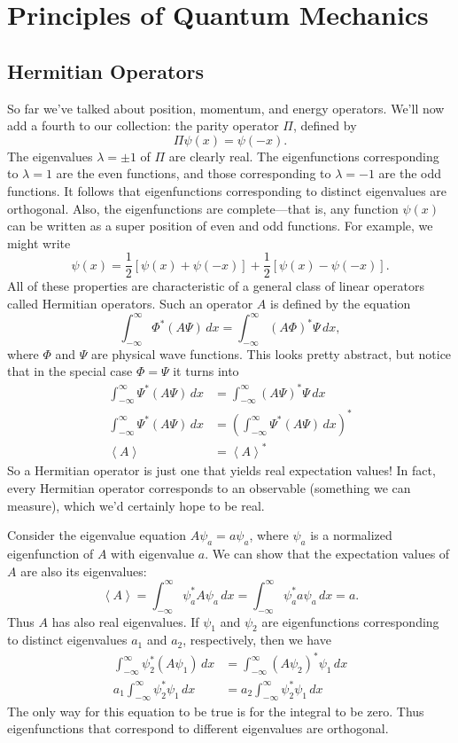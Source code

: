 \documentclass[../p052main.tex]{subfiles}
\begin{document}
\chapter{Principles of Quantum Mechanics}
\section{Hermitian Operators}
So far we've talked about position, momentum, and energy operators.
We'll now add a fourth to our collection: the parity operator $\Pi$, defined by
\[ \Pi \psi(x) = \psi(-x). \]
The eigenvalues $\lambda = \pm 1$ of $\Pi$ are clearly real.
The eigenfunctions corresponding to $\lambda = 1$ are the even functions, and those corresponding to $\lambda = -1$ are the odd functions.
It follows that eigenfunctions corresponding to distinct eigenvalues are orthogonal.
Also, the eigenfunctions are complete---that is, any function $\psi(x)$ can be written as a super position of even and odd functions.
For example, we might write
\[ \psi (x) = \frac{1}{2} \left[ \psi(x) + \psi(-x) \right] + \frac{1}{2} \left[ \psi(x) - \psi(-x) \right]. \]
All of these properties are characteristic of a general class of linear operators called Hermitian operators.
Such an operator $A$ is defined by the equation
\[ \int_{-\infty}^{\infty} \Phi^* \left( A \Psi \right) \,dx = \int_{-\infty}^{\infty} \left( A \Phi \right)^* \Psi \,dx, \]
where $\Phi$ and $\Psi$ are physical wave functions.
This looks pretty abstract, but notice that in the special case $\Phi = \Psi$ it turns into
\begin{align*}
    \int_{-\infty}^{\infty} \Psi^* \left( A \Psi \right) \,dx &= \int_{-\infty}^{\infty} \left( A \Psi \right)^* \Psi \,dx \\
    \int_{-\infty}^{\infty} \Psi^* \left( A \Psi \right) \,dx &= \left( \int_{-\infty}^{\infty} \Psi^* \left( A \Psi \right) \,dx \right)^* \\
    \left< A \right> &= \left< A \right>^*
\end{align*}
So a Hermitian operator is just one that yields real expectation values!
In fact, every Hermitian operator corresponds to an observable (something we can measure), which we'd certainly hope to be real.

Consider the eigenvalue equation $A \psi_a = a \psi_a$, where $\psi_a$ is a normalized eigenfunction of $A$ with eigenvalue $a$.
We can show that the expectation values of $A$ are also its eigenvalues:
\[ \left< A \right> = \int_{-\infty}^{\infty} \psi_a^* A \psi_a \,dx = \int_{-\infty}^{\infty} \psi_a^* a \psi_a \,dx = a. \]
Thus $A$ has also real eigenvalues.
If $\psi_1$ and $\psi_2$ are eigenfunctions corresponding to distinct eigenvalues $a_1$ and $a_2$, respectively, then we have
\begin{align*}
    \int_{-\infty}^{\infty} \psi_2^* (A \psi_1) \,dx &= \int_{-\infty}^{\infty} (A \psi_2)^* \psi_1 \,dx \\
    a_1 \int_{-\infty}^{\infty} \psi_2^* \psi_1 \,dx &= a_2 \int_{-\infty}^{\infty} \psi_2^* \psi_1 \,dx
\end{align*}
The only way for this equation to be true is for the integral to be zero.
Thus eigenfunctions that correspond to different eigenvalues are orthogonal.
\end{document}
